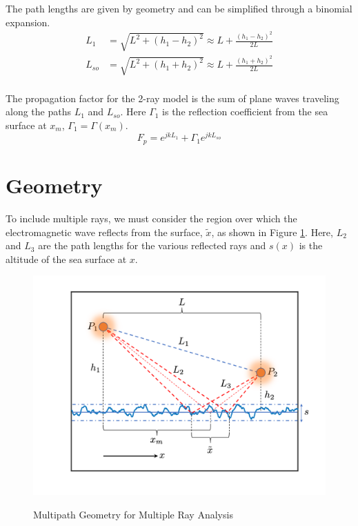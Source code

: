 \noindent The path lengths are given by geometry and can be simplified through a binomial expansion.
\begin{equation}
\begin{aligned}
L_1 & = \sqrt{L^2 + (h_1-h_2)^2}  \approx L + \frac{(h_1 - h_2)^2}{2L}\\
L_{so} & = \sqrt{L^2 + (h_1+h_2)^2}  \approx L + \frac{(h_1 + h_2)^2}{2L}\\
\end{aligned}
\label{mp_eq:1}
\end{equation}
\renewcommand{\baselinestretch}{2} \small\normalsize

The propagation factor for the 2-ray model is the sum of plane waves traveling along the paths $L_1$ and $L_{so}$. Here $\Gamma_1$ is the reflection coefficient from the sea surface at $x_m$, $\Gamma_1 = \Gamma(x_m)$.
\begin{equation}
\boxed{F_p = e^{jkL_1} + \Gamma_1e^{jkL_{so}}}
\label{mp_eq:1b}
\end{equation}

\section{Geometry}
To include multiple rays, we must consider the region over which the electromagnetic wave reflects from the surface, $\tilde{x}$, as shown in Figure \ref{mp_fig:2}. Here, $L_2$ and $L_3$ are the path lengths for the various reflected rays and $s(x)$ is the altitude of the sea surface at $x$. 

\begin{figure}[H]
  \begin{center}
\includegraphics[width=5in]{../media/analysis/multipath_layout.png}
  \end{center}
  \renewcommand{\baselinestretch}{1} \small\normalsize
  \begin{quote}
    \caption[Multipath Geometry for Multiple Ray Analysis]{Multipath Geometry for Multiple Ray Analysis\label{mp_fig:2}}
  \end{quote}
\end{figure}
\renewcommand{\baselinestretch}{2} \small\normalsize

